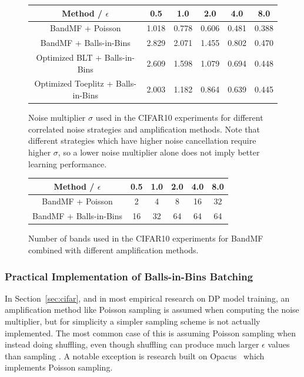 \begin{figure}
\begin{center}
\begin{tabular}{|c|c|c|c|c|c|}
\hline
 Method / $\epsilon$ & 0.5 & 1.0 & 2.0 & 4.0 & 8.0 \\ 
 \hline
 BandMF + Poisson & 1.018 & 0.778 & 0.606 & 0.481 & 0.388 \\  
 \hline
 BandMF + Balls-in-Bins & 2.829 & 2.071 & 1.455 & 0.802 & 0.470\\  
 \hline
 Optimized BLT + Balls-in-Bins & 2.609 & 1.598 & 1.079 & 0.694 & 0.448 \\  
 \hline
 Optimized Toeplitz + Balls-in-Bins & 2.003 & 1.182 & 0.864 & 0.639 & 0.445 \\  
 \hline
\end{tabular}
\end{center}
\caption{Noise multiplier $\sigma$ used in the CIFAR10 experiments for different correlated noise strategies and amplification methods. Note that different strategies which have higher noise cancellation require higher $\sigma$, so a lower noise multiplier alone does not imply better learning performance.}
\end{figure}

\begin{figure}
\begin{center}
\begin{tabular}{|c|c|c|c|c|c|}
\hline
 Method / $\epsilon$ & 0.5 & 1.0 & 2.0 & 4.0 & 8.0 \\ 
 \hline
 BandMF + Poisson & 2 & 4 & 8 & 16 & 32 \\  
 \hline
 BandMF + Balls-in-Bins & 16 & 32 & 64 & 64 & 64\\  
 \hline
\end{tabular}
\end{center}
\caption{Number of bands used in the CIFAR10 experiments for BandMF combined with different amplification methods.}
\end{figure}



\subsubsection{Practical Implementation of Balls-in-Bins Batching}\label{sec:practical}

In Section~\ref{sec:cifar}, and in most empirical research on DP model training, an amplification method like Poisson sampling is assumed when computing the noise multiplier, but for simplicity a simpler sampling scheme is not actually implemented. The most common case of this is assuming Poisson sampling when instead doing shuffling, even though shuffling can produce much larger $\epsilon$ values than sampling \citep{chua2024private}. A notable exception is research built on Opacus~\citep{opacus} which implements Poisson sampling.

